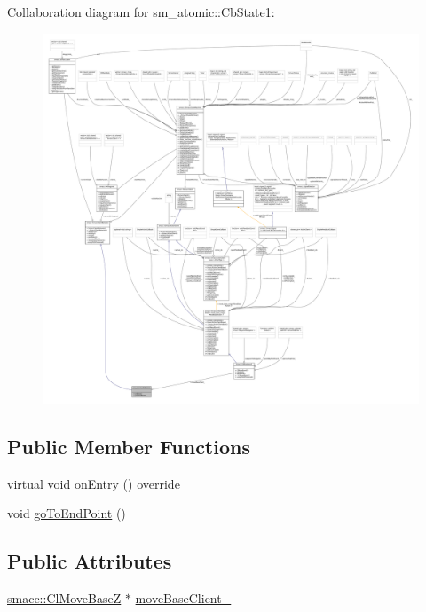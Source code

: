 Collaboration diagram for sm\+\_\+atomic\+:\+:Cb\+State1\+:
\nopagebreak
\begin{figure}[H]
\begin{center}
\leavevmode
\includegraphics[width=350pt]{structsm__atomic_1_1CbState1__coll__graph}
\end{center}
\end{figure}
\subsection*{Public Member Functions}
\begin{DoxyCompactItemize}
\item 
virtual void \hyperlink{structsm__atomic_1_1CbState1_afdd883f27c415d8485658c74fae1008e}{on\+Entry} () override
\item 
void \hyperlink{structsm__atomic_1_1CbState1_ae27f060a983c1128d3c928eed45eae6b}{go\+To\+End\+Point} ()
\end{DoxyCompactItemize}
\subsection*{Public Attributes}
\begin{DoxyCompactItemize}
\item 
\hyperlink{classsmacc_1_1ClMoveBaseZ}{smacc\+::\+Cl\+Move\+BaseZ} $\ast$ \hyperlink{structsm__atomic_1_1CbState1_a8b4b01655654c03cd1f01ad7cf3feb02}{move\+Base\+Client\+\_\+}
\end{DoxyCompactItemize}


